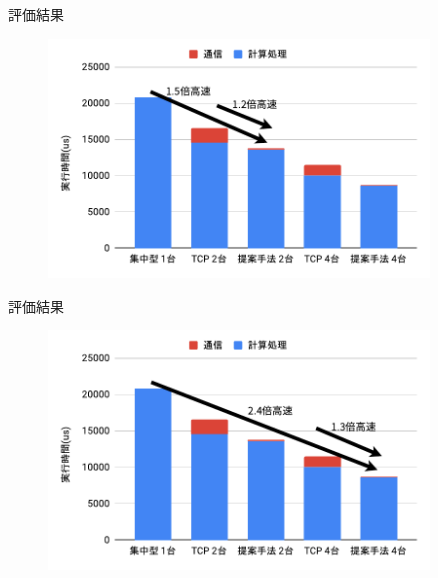 \documentclass[12pt, unicode]{beamer}
\begin{document}
\begin{frame}{評価結果}
  \begin{figure}[h]
    \centering
    \includegraphics[width=0.9\textwidth]{pictures/EvaluationResult1.pdf}
  \end{figure}
\end{frame}

\begin{frame}{評価結果}
  \begin{figure}[h]
    \centering
    \includegraphics[width=0.9\textwidth]{pictures/EvaluationResult2.pdf}
  \end{figure}
\end{frame}
\end{document}
